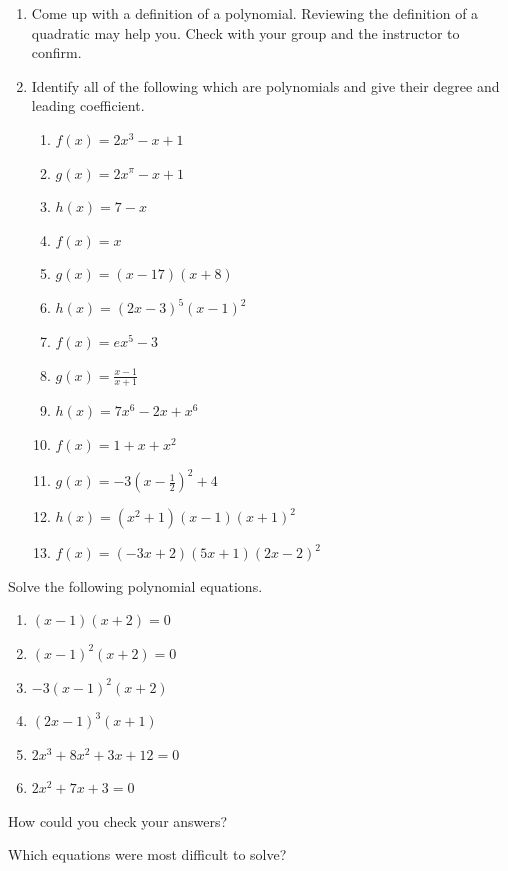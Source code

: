 \documentclass[noauthor,noinstructornotes]{ximera}
\begin{document}
\begin{problem}
\begin{enumerate}
    \item Come up with a definition of a polynomial. Reviewing the
    definition of a quadratic may help you. Check with your group
    and the instructor to confirm.
    \item Identify all of the following which are polynomials 
    and give their degree and leading coefficient.
    \begin{enumerate}
        \item \(f\left(x\right)=2x^3-x+1\)
	    \item \(g\left(x\right)=2x^\pi-x+1\)
	    \item \(h\left(x\right)=7-x\)
	    \item \(f\left(x\right)=x\)
	    \item \(g\left(x\right)=\left(x-17\right)\left(x+8\right)\)
	    \item \(h\left(x\right)=\left(2x-3\right)^5\left(x-1\right)^2\)
	    \item \(f\left(x\right)= e x^5-3\)
	    \item \(g\left(x\right)=\frac{x-1}{x+1}\)
	    \item \(h\left(x\right)=7x^6-2x+x^6\)
	    \item \(f\left(x\right)=1+x+x^2\)
	    \item \(g\left(x\right)=-3\left(x-\frac{1}{2}\right)^2+4\)
	    \item \(h\left(x\right)=\left(x^2+1\right)\left(x-1\right)\left(x+1\right)^2\)
	    \item \(f\left(x\right)=\left(-3x+2\right)\left(5x+1\right)\left(2x-2\right)^2\) 
    \end{enumerate}
\end{enumerate}
\end{problem}

\begin{problem}
Solve the following polynomial equations.

\begin{enumerate}
    \item \((x - 1)(x + 2) = 0\)
    \item \((x - 1)^2(x + 2) = 0\)
    \item \(-3(x - 1)^2(x + 2)\)
    \item \((2x - 1)^3(x + 1)\)
    \item \(2x^3 + 8x^2 + 3x + 12 = 0\)
    \item \(2x^2 + 7x + 3 = 0\)
\end{enumerate}

How could you check your answers? 

Which equations were most difficult to solve?
\end{problem}
\end{document}
